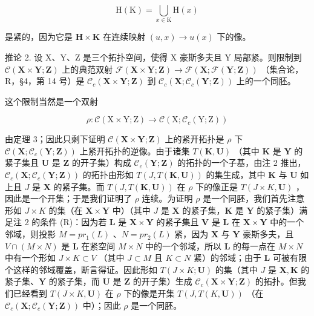 \[
\mathrm{H} (\mathrm{K}) = \bigcup_ {x \in \mathrm{K}} \mathrm{H} (x)
\]

是紧的，因为它是 \(\mathbf{H} \times \mathbf{K}\) 在连续映射 \((u, x) \to u(x)\) 下的像。

推论 2. 设 X、Y、Z 是三个拓扑空间，使得 X 豪斯多夫且 Y 局部紧。则限制到 \(\mathcal{C}(\mathbf{X} \times \mathbf{Y}; \mathbf{Z})\) 上的典范双射 \(\mathcal{F}(\mathbf{X} \times \mathbf{Y}; \mathbf{Z}) \to \mathcal{F}(\mathbf{X}; \mathcal{F}(\mathbf{Y}; \mathbf{Z}))\) （集合论，R，§4，第 14 号）是 \(\mathcal{C}_c(\mathbf{X} \times \mathbf{Y}; \mathbf{Z})\) 到 \(\mathcal{C}_c(\mathbf{X}; \mathcal{C}_c(\mathbf{Y}; \mathbf{Z}))\) 上的一个同胚。

这个限制当然是一个双射

\[
\rho : \mathcal {C} (\mathrm{X} \times \mathrm{Y}; \mathrm{Z}) \rightarrow \mathcal {C} (\mathrm{X}; \mathcal {C} _ {c} (\mathrm{Y}; \mathrm{Z}))
\]

由定理 3；因此只剩下证明 \(\mathcal{C}(\mathbf{X}\times\mathbf{Y};\mathbf{Z})\) 上的紧开拓扑是 \(\rho\) 下 \(\mathcal{C}(\mathbf{X};\mathcal{C}_{c}(\mathbf{Y};\mathbf{Z}))\) 上紧开拓扑的逆像。由于诸集 \(T(\mathbf{K},\mathbf{U})\) （其中 \(\mathbf{K}\) 是 \(\mathbf{Y}\) 的紧子集且 \(\mathbf{U}\) 是 \(\mathbf{Z}\) 的开子集）构成 \(\mathcal{C}_{c}(\mathbf{Y};\mathbf{Z})\) 的拓扑的一个子基，由注 2 推出，\(\mathcal{C}_{c}(\mathbf{X};\mathcal{C}_{c}(\mathbf{Y};\mathbf{Z}))\) 的拓扑由形如 \(T(J,T(\mathbf{K},\mathbf{U}))\) 的集生成，其中 \(\mathbf{K}\) 与 \(\mathbf{U}\) 如上且 \(J\) 是 \(\mathbf{X}\) 的紧子集。而 \(T(J,T(\mathbf{K},\mathbf{U}))\) 在 \(\rho\) 下的像正是 \(T(J\times K,\mathbf{U})\) ，因此是一个开集；于是我们证明了 \(\rho\) 连续。为证明 \(\rho\) 是一个同胚，我们首先注意形如 \(J\times K\) 的集（在 \(\mathbf{X}\times\mathbf{Y}\) 中）（其中 \(J\) 是 \(\mathbf{X}\) 的紧子集，\(\mathbf{K}\) 是 \(\mathbf{Y}\) 的紧子集）满足注 2 的条件 (R)：因为若 \(\mathbf{L}\) 是 \(\mathbf{X}\times\mathbf{Y}\) 的紧子集且 \(\mathbf{V}\) 是 \(\mathbf{L}\) 在 \(\mathbf{X}\times\mathbf{Y}\) 中的一个邻域，则投影 \(M=pr_{1}(L)\) 、\(N=pr_{2}(L)\) 紧，因为 \(\mathbf{X}\) 与 \(\mathbf{Y}\) 豪斯多夫，且 \(V\cap(M\times N)\) 是 \(\mathbf{L}\) 在紧空间 \(M\times N\) 中的一个邻域，所以 \(\mathbf{L}\) 的每一点在 \(M\times N\) 中有一个形如 \(J\times K\subset V\) （其中 \(J\subset M\) 且 \(K\subset N\) 紧）的邻域；由于 \(\mathbf{L}\) 可被有限个这样的邻域覆盖，断言得证。因此形如 \(T(J\times K;\mathbf{U})\) 的集（其中 \(J\) 是 \(\mathbf{X},\mathbf{K}\) 的紧子集、\(\mathbf{Y}\) 的紧子集，而 \(\mathbf{U}\) 是 \(\mathbf{Z}\) 的开子集）生成 \(\mathcal{C}_{c}(\mathbf{X}\times\mathbf{Y};\mathbf{Z})\) 的拓扑。但我们已经看到 \(T(J\times K,\mathbf{U})\) 在 \(\rho\) 下的像是开集 \(T(J,T(K,\mathbf{U}))\) （在 \(\mathcal{C}_{c}(\mathbf{X};\mathcal{C}_{c}(\mathbf{Y};\mathbf{Z}))\) 中）；因此 \(\rho\) 是一个同胚。

